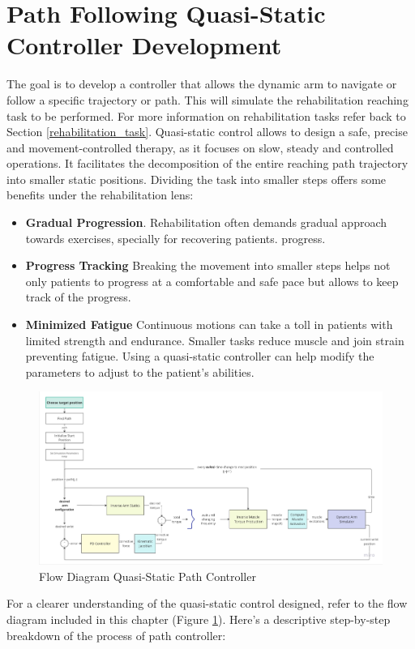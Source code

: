 \newpage
\section{Path Following Quasi-Static Controller Development } \label{sec:path}

The goal is to develop a controller that allows the dynamic arm  to navigate or follow a specific trajectory or path. This will simulate the rehabilitation reaching task to be performed. For more information on rehabilitation tasks refer back to Section \ref{rehabilitation_task}. Quasi-static control allows to design a safe, precise and movement-controlled therapy, as it focuses on slow, steady and controlled operations. It facilitates the decomposition of the entire reaching path trajectory into smaller static positions. Dividing the task into smaller steps offers some benefits under the rehabilitation lens:
\begin{itemize}
    \item \textbf{Gradual Progression}. Rehabilitation often demands gradual approach towards exercises, specially for recovering patients. progress.
    \item \textbf{Progress Tracking} Breaking the movement into smaller steps helps not only patients to progress at a comfortable and safe pace but allows to keep track of the progress.
    \item \textbf{Minimized Fatigue} Continuous motions can take a toll in patients with limited strength and endurance. Smaller tasks reduce muscle and join strain preventing fatigue. Using a quasi-static controller can help modify the parameters to adjust to the patient's abilities. 
\end{itemize}

\begin{figure}[h!]
    \centering
    \includegraphics[width=1\textwidth]{Pictures/Controller/Quasi-Static Path Controller.jpg}
    \caption{Flow Diagram Quasi-Static Path Controller }
    \label{fig:PathController}
\end{figure}
\newpage
For a clearer understanding of the quasi-static control designed, refer to the flow diagram included in this chapter (Figure \ref{fig:PathController}). Here’s a descriptive step-by-step breakdown of the process of path controller:

